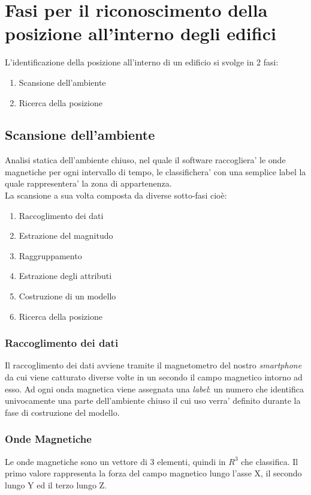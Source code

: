 \chapter*{Fasi per il riconoscimento della posizione all'interno degli edifici}
L'identificazione della posizione all'interno di un edificio si svolge in 2 fasi:
\begin{enumerate}
	\item Scansione dell'ambiente
	\item Ricerca della posizione
\end{enumerate}

\section*{Scansione dell'ambiente}
Analisi statica dell'ambiente chiuso, nel quale il software raccogliera' le onde magnetiche per ogni intervallo di tempo, le classifichera' con una semplice label la quale rappresentera' la zona di appartenenza.\\
La scansione a sua volta composta da diverse sotto-fasi cio\`{e}:
\begin{enumerate}
	\item Raccoglimento dei dati
	\item Estrazione del magnitudo
	\item Raggruppamento
	\item Estrazione degli attributi
	\item Costruzione di un modello
	\item Ricerca della posizione
\end{enumerate}
\newpage
\subsection*{Raccoglimento dei dati}
Il raccoglimento dei dati avviene tramite il magnetometro del nostro \textit{smartphone} da cui viene catturato diverse volte in un secondo il campo magnetico intorno ad esso.
Ad ogni onda magnetica viene assegnata una \textit{label}: un numero che identifica univocamente una parte dell'ambiente chiuso il cui uso verra' definito durante la fase di costruzione del modello.

\subsection*{Onde Magnetiche}
Le onde magnetiche sono un vettore di 3 elementi, quindi in $R^3$ che classifica. Il primo valore rappresenta la forza del campo magnetico lungo l'asse X, il secondo lungo Y ed il terzo lungo Z.


